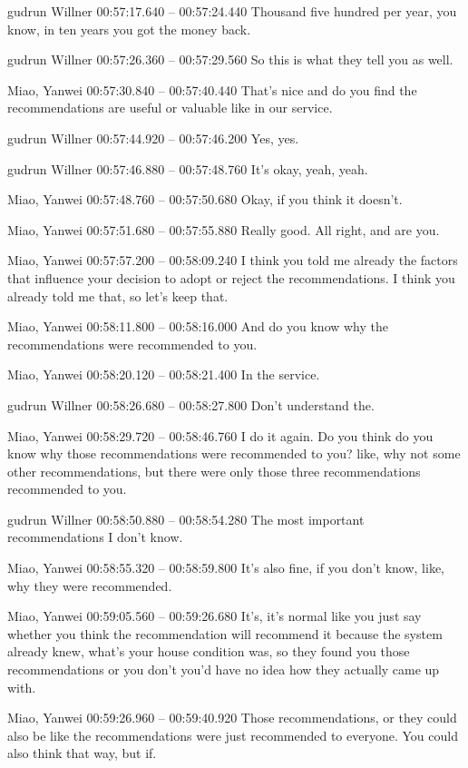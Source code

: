 {gudrun Willner 00:57:17.640 -- 00:57:24.440
Thousand five hundred per year, you know, in ten years you got the money back.

gudrun Willner 00:57:26.360 -- 00:57:29.560
So this is what they tell you as well.

Miao, Yanwei 00:57:30.840 -- 00:57:40.440
That's nice and do you find the recommendations are useful or valuable like in our service.

gudrun Willner 00:57:44.920 -- 00:57:46.200
Yes, yes.

gudrun Willner 00:57:46.880 -- 00:57:48.760
It's okay, yeah, yeah.

Miao, Yanwei 00:57:48.760 -- 00:57:50.680
Okay, if you think it doesn't.

Miao, Yanwei 00:57:51.680 -- 00:57:55.880
Really good. All right, and are you.

Miao, Yanwei 00:57:57.200 -- 00:58:09.240
I think you told me already the factors that influence your decision to adopt or reject the recommendations. I think you already told me that, so let's keep that.

Miao, Yanwei 00:58:11.800 -- 00:58:16.000
And do you know why the recommendations were recommended to you.

Miao, Yanwei 00:58:20.120 -- 00:58:21.400
In the service.

gudrun Willner 00:58:26.680 -- 00:58:27.800
Don't understand the.

Miao, Yanwei 00:58:29.720 -- 00:58:46.760
I do it again. Do you think do you know why those recommendations were recommended to you? like, why not some other recommendations, but there were only those three recommendations recommended to you.

gudrun Willner 00:58:50.880 -- 00:58:54.280
The most important recommendations I don't know.

Miao, Yanwei 00:58:55.320 -- 00:58:59.800
It's also fine, if you don't know, like, why they were recommended.

Miao, Yanwei 00:59:05.560 -- 00:59:26.680
It's, it's normal like you just say whether you think the recommendation will recommend it because the system already knew, what's your house condition was, so they found you those recommendations or you don't you'd have no idea how they actually came up with.

Miao, Yanwei 00:59:26.960 -- 00:59:40.920
Those recommendations, or they could also be like the recommendations were just recommended to everyone. You could also think that way, but if.

}
